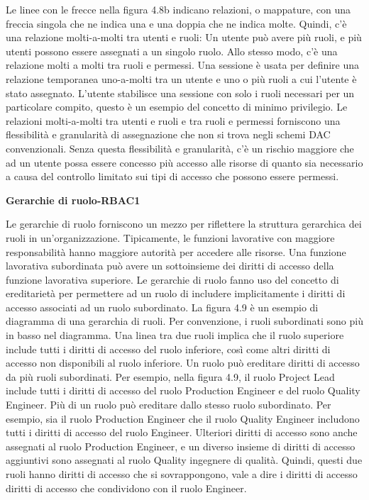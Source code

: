 Le linee con le frecce nella figura 4.8b indicano relazioni, o mappature, con una freccia singola che ne indica una e una doppia che ne indica molte. Quindi, c'è una relazione molti-a-molti tra utenti e ruoli: Un utente può avere più ruoli, e più utenti possono essere assegnati a un singolo ruolo. Allo stesso modo, c'è una relazione molti a molti tra ruoli e permessi. Una sessione è usata per definire una relazione temporanea uno-a-molti tra un utente e uno o più ruoli a cui l'utente è stato assegnato. L'utente stabilisce una sessione con solo i ruoli necessari per un particolare compito, questo è un esempio del concetto di minimo privilegio. Le relazioni molti-a-molti tra utenti e ruoli e tra ruoli e permessi forniscono una flessibilità e granularità di assegnazione che non si trova negli schemi DAC convenzionali. Senza questa flessibilità e granularità, c'è un rischio maggiore che ad un utente possa essere concesso più accesso alle risorse di quanto sia necessario a causa del controllo limitato sui tipi di accesso che possono essere permessi. 

\newpage
\begin{center}
    \textbf{Gerarchie di ruolo-RBAC1}
\end{center}

Le gerarchie di ruolo forniscono un mezzo per riflettere la struttura gerarchica dei ruoli in un'organizzazione. Tipicamente, le funzioni lavorative con maggiore responsabilità hanno maggiore autorità per accedere alle risorse. Una funzione lavorativa subordinata può avere un sottoinsieme dei diritti di accesso della funzione lavorativa superiore. Le gerarchie di ruolo fanno uso del concetto di ereditarietà per permettere ad un ruolo di includere implicitamente i diritti di accesso associati ad un ruolo subordinato. La figura 4.9 è un esempio di diagramma di una gerarchia di ruoli. Per convenzione, i ruoli subordinati sono più in basso nel diagramma. Una linea tra due ruoli implica che il ruolo superiore include tutti i diritti di accesso del ruolo inferiore, così come altri diritti di accesso non disponibili al ruolo inferiore. Un ruolo può ereditare diritti di accesso da più ruoli subordinati. Per esempio, nella figura 4.9, il ruolo Project Lead include tutti i diritti di accesso del ruolo Production Engineer e del ruolo Quality Engineer. Più di un ruolo può ereditare dallo stesso ruolo subordinato. Per esempio, sia il ruolo Production Engineer che il ruolo Quality Engineer includono tutti i diritti di accesso del ruolo Engineer. Ulteriori diritti di accesso sono anche assegnati al ruolo Production Engineer, e un diverso insieme di diritti di accesso aggiuntivi sono assegnati al ruolo Quality ingegnere di qualità. Quindi, questi due ruoli hanno diritti di accesso che si sovrappongono, vale a dire i diritti di accesso diritti di accesso che condividono con il ruolo Engineer.


